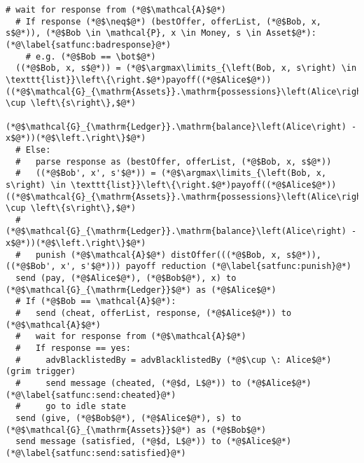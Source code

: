\begin{lstlisting}[label=satfunc, style=numbers]
  # wait for response from (*@$\mathcal{A}$@*)
  # If response (*@$\neq$@*) (bestOffer, offerList, (*@$Bob, x, s$@*)), (*@$Bob \in \mathcal{P}, x \in Money, s \in Asset$@*): (*@\label{satfunc:badresponse}@*)
    # e.g. (*@$Bob == \bot$@*)
  ((*@$Bob, x, s$@*)) = (*@$\argmax\limits_{\left(Bob, x, s\right) \in \texttt{list}}\left\{\right.$@*)payoff((*@$Alice$@*))((*@$\mathcal{G}_{\mathrm{Assets}}.\mathrm{possessions}\left(Alice\right) \cup \left\{s\right\},$@*)
        (*@$\mathcal{G}_{\mathrm{Ledger}}.\mathrm{balance}\left(Alice\right) - x$@*))(*@$\left.\right\}$@*)
  # Else:
  #   parse response as (bestOffer, offerList, (*@$Bob, x, s$@*))
  #   ((*@$Bob', x', s'$@*)) = (*@$\argmax\limits_{\left(Bob, x, s\right) \in \texttt{list}}\left\{\right.$@*)payoff((*@$Alice$@*))((*@$\mathcal{G}_{\mathrm{Assets}}.\mathrm{possessions}\left(Alice\right) \cup \left\{s\right\},$@*)
  #      (*@$\mathcal{G}_{\mathrm{Ledger}}.\mathrm{balance}\left(Alice\right) - x$@*))(*@$\left.\right\}$@*)
  #   punish (*@$\mathcal{A}$@*) distOffer(((*@$Bob, x, s$@*)), ((*@$Bob', x', s'$@*))) payoff reduction (*@\label{satfunc:punish}@*)
  send (pay, (*@$Alice$@*), (*@$Bob$@*), x) to (*@$\mathcal{G}_{\mathrm{Ledger}}$@*) as (*@$Alice$@*)
  # If (*@$Bob == \mathcal{A}$@*):
  #   send (cheat, offerList, response, (*@$Alice$@*)) to (*@$\mathcal{A}$@*)
  #   wait for response from (*@$\mathcal{A}$@*)
  #   If response == yes:
  #     advBlacklistedBy = advBlacklistedBy (*@$\cup \: Alice$@*) (grim trigger)
  #     send message (cheated, (*@$d, L$@*)) to (*@$Alice$@*) (*@\label{satfunc:send:cheated}@*)
  #     go to idle state
  send (give, (*@$Bob$@*), (*@$Alice$@*), s) to (*@$\mathcal{G}_{\mathrm{Assets}}$@*) as (*@$Bob$@*)
  send message (satisfied, (*@$d, L$@*)) to (*@$Alice$@*) (*@\label{satfunc:send:satisfied}@*)
\end{lstlisting}
